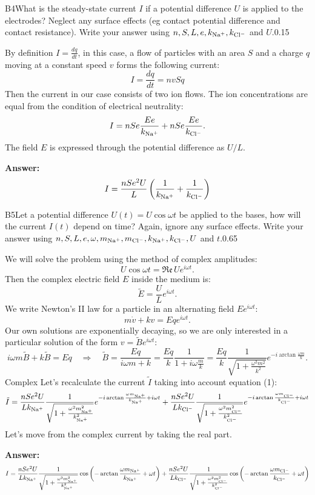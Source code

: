 \documentclass[11pt,a4paper]{article}
\begin{document}
\begin{solcard}{B4}{What is the steady-state current $I$ if a potential difference $U$ is applied to the electrodes? Neglect any surface effects (eg contact potential difference and contact resistance). Write your answer using $n,S,L,e,k_{\rm Na^+}, k_{\rm Cl^-}$ and $U$.}{0.15}

By definition $I = \frac{dq}{dt}$, in this case, a flow of particles with an area $S$ and a charge $q$ moving at a constant speed $v$ forms the following current: \[ I = \frac{dq}{dt}= nvSq  \tag{1}\] Then the current in our case consists of two ion flows. The ion concentrations are equal from the condition of electrical neutrality: \[ I = nSe \frac{Ee}{k_{\rm Na^+}} + nSe \frac{Ee}{k_{\rm Cl^-}}.\] The field $E$ is expressed through the potential difference as $U/L$.

\par\smallskip\noindent\textbf{Answer:} \[ I = \frac{nSe^2U}{L} \left( \frac{1}{k_{\rm Na^+}}+\frac{1}{k_{\rm Cl^-}} \right)\]
\end{solcard}

\begin{solcard}{B5}{Let a potential difference $U(t) = U \cos \omega t$ be applied to the bases, how will the current $I(t)$ depend on time? Again, ignore any surface effects. Write your answer using $n,S,L,e,\omega,m_{\rm Na^+}, m_{\rm Cl^-},k_{\rm Na^+}, k_{\rm Cl^-}, U$ and $t$.}{0.65}

We will solve the problem using the method of complex amplitudes: \[ U \cos \omega t = \mathfrak{Re} \, U e^{i \omega t}. \] Then the complex electric field $E$ inside the medium is: \[ \tilde{E} = \frac{U}{L} e^{i \omega t}. \] We write Newton’s II law for a particle in an alternating field $Ee^{i\omega t}$: \[ m\dot{v} + kv = Eq e^{i \omega t}.\] Our own solutions are exponentially decaying, so we are only interested in a particular solution of the form $v=\tilde{B} e^{i \omega t}$: \[ i\omega m \tilde{B} + k\tilde{B} = Eq \quad \Rightarrow \quad \tilde{B} = \frac{Eq}{i \omega m + k} = \frac{Eq}{k} \frac{1}{1 + i\omega\frac{m}{k}} = \frac{Eq}{k} \frac{1}{\sqrt{1+\frac{\omega^2 m^2}{k^2} }}e^{-i\arctan \frac{\omega m}{k}}.\] Complex Let's recalculate the current $\tilde{I}$ taking into account equation (1): \[ \tilde{I} = \frac{nSe^2 U}{Lk_{\rm Na^+}} \frac{1}{\sqrt{1+\frac{\omega^2 m_{\rm Na^+}^2}{k_{\rm Na^+}^2} }} e^{-i\arctan \frac{\omega m_{\rm Na^+}}{k_{\rm Na^+}} +i \omega t} + \frac{nSe^2 U}{Lk_{\rm Cl^-}} \frac{1}{\sqrt{1+\frac{\omega^2 m_{\rm Cl^-}^2}{k_{\rm Cl^-}^2} }} e^{-i\arctan \frac{\omega m_{\rm Cl^-}}{k_{\rm Cl^-}}+i \omega t}\] Let's move from the complex current by taking the real part.

\par\smallskip\noindent\textbf{Answer:} \[ I = \frac{nSe^2 U}{Lk_{\rm Na^+}} \frac{1}{\sqrt{1+\frac{\omega^2 m_{\rm Na^+}^2}{k_{\rm Na^+}^2} }} \cos \left( -\arctan \frac{\omega m_{\rm Na^+}}{k_{\rm Na^+}} +\omega t \right) + \frac{nSe^2 U}{Lk_{\rm Cl^-}} \frac{1}{\sqrt{1+\frac{\omega^2 m_{\rm Cl^-}^2}{k_{\rm Cl^-}^2} }} \cos \left( -\arctan \frac{\omega m_{\rm Cl^-}}{k_{\rm Cl^-}} +\omega t \right) \]
\end{solcard}
\end{document}

